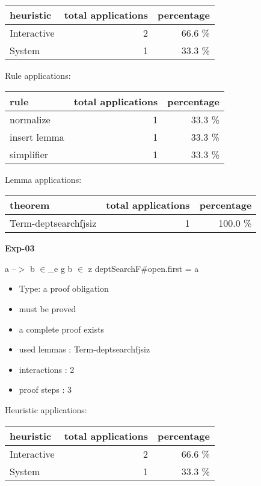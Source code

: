 \documentclass[a4paper]{article}
\begin{document}
\begin{supertabular}{l|r|r}
heuristic	& total applications & percentage \\ \hline
Interactive & 2 & 66.6 \% \\
System & 1 & 33.3 \% \\

\end{supertabular}

Rule applications:

\begin{supertabular}{l|r|r}
rule	        & total applications & percentage \\ \hline
normalize & 1 & 33.3 \% \\
insert lemma & 1 & 33.3 \% \\
simplifier & 1 & 33.3 \% \\

\end{supertabular}

Lemma applications:

\begin{supertabular}{l|r|r}
theorem	        & total applications & percentage \\ \hline
Term-deptsearchfjsiz & 1 & 100.0 \% \\

\end{supertabular}
\pagebreak

{\LARGE\bf Exp-03}\label{lemma-Exp-03}

\medskip

 \Fol a --$>$ b $\in$\_e g \And b $\in$ z \Imp \Do deptSearchF\#\Dc open.first = a

\begin{itemize}

\item Type: a proof obligation

\item       must be proved
\item       a complete proof exists
\item       used lemmas  : Term-deptsearchfjsiz
\item       interactions : 2
\item       proof steps  : 3
\end{itemize}

\medskip


Heuristic applications:

\begin{supertabular}{l|r|r}
heuristic	& total applications & percentage \\ \hline
Interactive & 2 & 66.6 \% \\
System & 1 & 33.3 \% \\

\end{supertabular}
\end{document}
